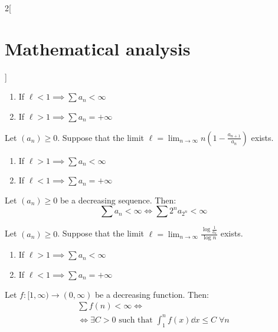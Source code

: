 \documentclass[../../../main.tex]{subfiles}
\begin{document}
\begin{multicols}{2}[\section{Mathematical analysis}]
\begin{theorem}
    \begin{enumerate}
      \item If $\ell<1\implies\sum a_n<\infty$
      \item If $\ell>1\implies\sum a_n=+\infty$
    \end{enumerate}
  \end{theorem}
  \begin{theorem}
    Let $(a_n)\geq 0$. Suppose that the limit $\displaystyle \ell=\lim_{n\to\infty}n\left(1-\frac{a_{n+1}}{a_n}\right)$ exists.
    \begin{enumerate}
      \item If $\ell>1\implies\sum a_n<\infty$
      \item If $\ell<1\implies\sum a_n=+\infty$
    \end{enumerate}
  \end{theorem}
  \begin{theorem}
    Let $(a_n)\geq 0$ be a decreasing sequence. Then: $$\textstyle\sum a_n<\infty\iff\sum 2^na_{2^n}<\infty$$
  \end{theorem}
  \begin{theorem}
    Let $(a_n)\geq 0$. Suppose that the limit $\displaystyle \ell=\lim_{n\to\infty}\frac{\log\frac{1}{a_n}}{\log n}$ exists.
    \begin{enumerate}
      \item If $\ell>1\implies\sum a_n<\infty$
      \item If $\ell<1\implies\sum a_n=+\infty$
    \end{enumerate}
  \end{theorem}
  \begin{theorem}\label{MA_inttest}
    Let $f:[1,\infty)\rightarrow(0,\infty)$ be a decreasing function. Then:
    \begin{multline*}
      \textstyle\sum f(n)<\infty\iff\\ \displaystyle\iff\exists C>0\text{ such that }\int_1^nf(x)\dd{x}\leq C\;\forall n
    \end{multline*}
  \end{theorem}

\end{multicols}
\end{document}
